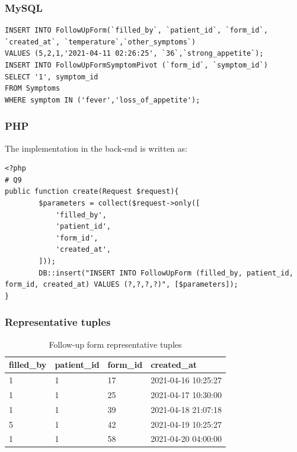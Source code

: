 \subsubsection{MySQL}
\begin{verbatim}
INSERT INTO FollowUpForm(`filled_by`, `patient_id`, `form_id`, `created_at`, `temperature`,`other_symptoms`)
VALUES (5,2,1,'2021-04-11 02:26:25', `36`,`strong_appetite`);
INSERT INTO FollowUpFormSymptomPivot (`form_id`, `symptom_id`) 
SELECT '1', symptom_id
FROM Symptoms 
WHERE symptom IN ('fever','loss_of_appetite');
\end{verbatim}

\subsubsection{PHP}
The implementation in the back-end is written as:\\
\begin{verbatim}
<?php
# Q9
public function create(Request $request){
        $parameters = collect($request->only([
            'filled_by',
            'patient_id',
            'form_id',
            'created_at',
        ]));
        DB::insert("INSERT INTO FollowUpForm (filled_by, patient_id, form_id, created_at) VALUES (?,?,?,?)", [$parameters]);
}
\end{verbatim}
\subsubsection{Representative tuples}
\begin{table}[ht]
\centering
\begin{tabular}{|l|l|l|l|} 
        \hline
        filled\_by & patient\_id & form\_id & created\_at \\
        \hline 
        1&1& 17 & 2021-04-16 10:25:27 \\
        1&1 & 25 & 2021-04-17 10:30:00\\
        1&1 & 39 & 2021-04-18 21:07:18\\
        5&1 & 42 & 2021-04-19 10:25:27\\
        1&1 & 58 & 2021-04-20 04:00:00\\
        \hline
\end{tabular}
\caption{Follow-up form representative tuples}
\end{table}
